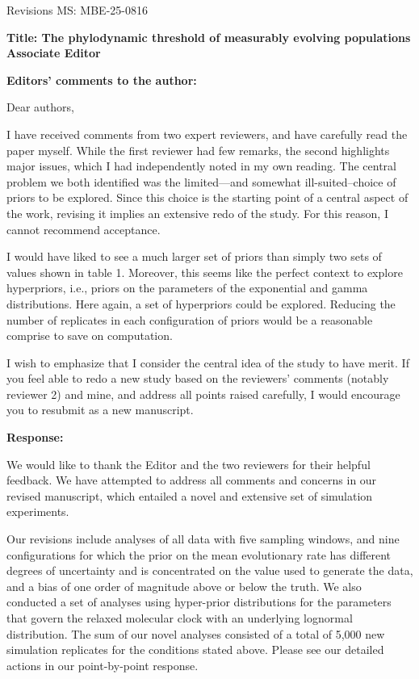 \documentclass[11pt]{article}
\begin{document}
Revisions MS: MBE-25-0816

\textbf{Title: The phylodynamic threshold of measurably evolving populations}
\newline
\newline
\textbf{Associate Editor}

\textbf{Editors’ comments to the author:}

Dear authors,

I have received comments from two expert reviewers, and have carefully read the paper myself.  While the first reviewer had few remarks, the second highlights major issues, which I had independently noted in my own reading.  The central problem we both identified was the limited---and somewhat ill-suited--choice of priors to be explored.  Since this choice is the starting point of a central aspect of the work, revising it implies an extensive redo of the study.  For this reason, I cannot recommend acceptance.

I would have liked to see a much larger set of priors than simply two sets of values shown in table 1.  Moreover, this seems like the perfect context to explore hyperpriors, i.e., priors on the parameters of the exponential and gamma distributions.  Here again, a set of hyperpriors could be explored.  Reducing the number of replicates in each configuration of priors would be a reasonable comprise to save on computation.

I wish to emphasize that I consider the central idea of the study to have merit.  If you feel able to redo a new study based on the reviewers' comments (notably reviewer 2) and mine, and address all points raised carefully, I would encourage you to resubmit as a new manuscript.


{\color{blue}
\textbf{Response:}

We would like to thank the Editor and the two reviewers for their helpful feedback. We have attempted to address all comments and concerns in our revised manuscript, which entailed a novel and extensive set of simulation experiments.

Our revisions include analyses of all data with five sampling windows, and nine configurations for which the prior on the mean evolutionary rate has different degrees of uncertainty and is concentrated on the value used to generate the data, and a bias of one order of magnitude above or below the truth. We also conducted a set of analyses using hyper-prior distributions for the parameters that govern the relaxed molecular clock with an underlying lognormal distribution. The sum of our novel analyses consisted of a total of 5,000 new simulation replicates for the conditions stated above. Please see our detailed actions in our point-by-point response. 
}
\end{document}
